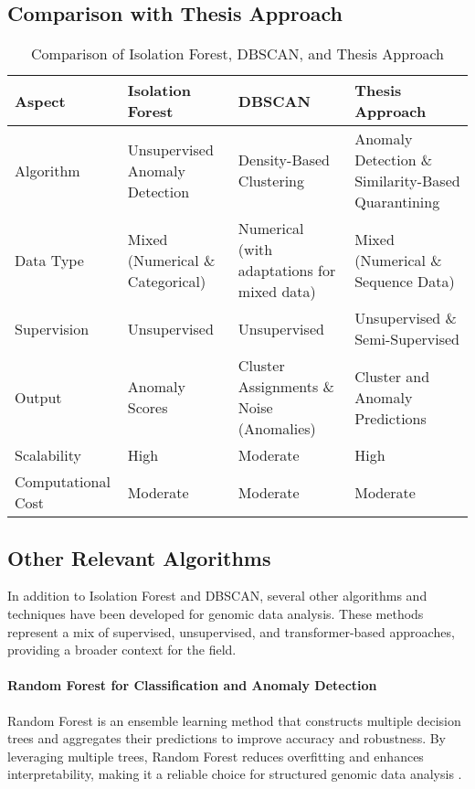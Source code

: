 \subsection{Comparison with Thesis Approach}
\begin{table}[h]
    \centering
    \caption{Comparison of Isolation Forest, DBSCAN, and Thesis Approach}
    \label{tab:comparison}
    \begin{tabular}{|p{2.5cm}|p{2.5cm}|p{2.5cm}|p{2.5cm}|}
    \hline
    \textbf{Aspect} & \textbf{Isolation Forest} & \textbf{DBSCAN} & \textbf{Thesis Approach} \\ \hline
    Algorithm & Unsupervised Anomaly Detection & Density-Based Clustering & Anomaly Detection \& Similarity-Based Quarantining \\ \hline
    Data Type & Mixed (Numerical \& Categorical) & Numerical (with adaptations for mixed data) & Mixed (Numerical \& Sequence Data) \\ \hline
    Supervision & Unsupervised & Unsupervised & Unsupervised \& Semi-Supervised \\ \hline
    Output & Anomaly Scores & Cluster Assignments \& Noise (Anomalies) & Cluster and Anomaly Predictions \\ \hline
    Scalability & High & Moderate & High \\ \hline
    Computational Cost & Moderate & Moderate & Moderate \\ \hline
    \end{tabular}
\end{table}


\subsection{Other Relevant Algorithms}
In addition to Isolation Forest and DBSCAN, several other algorithms and techniques have been developed for genomic data analysis. These methods represent a mix of supervised, unsupervised, and transformer-based approaches, providing a broader context for the field.
\paragraph{Random Forest for Classification and Anomaly Detection}
Random Forest is an ensemble learning method that constructs multiple decision trees and aggregates their predictions to improve accuracy and robustness. By leveraging multiple trees, Random Forest reduces overfitting and enhances interpretability, making it a reliable choice for structured genomic data analysis \cite{breiman2001random}.

